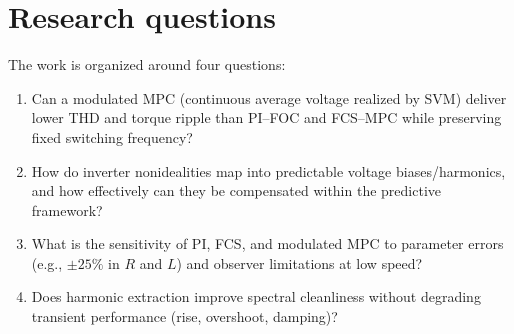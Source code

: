 \section{Research questions}
The work is organized around four questions:
\begin{enumerate}
  \item Can a modulated MPC (continuous average voltage realized by SVM) deliver lower THD and torque ripple than PI–FOC and FCS–MPC while preserving fixed switching frequency?
  \item How do inverter non\-idealities map into predictable voltage biases/harmonics, and how effectively can they be compensated within the predictive framework?
  \item What is the sensitivity of PI, FCS, and modulated MPC to parameter errors (e.g., $\pm25\%$ in $R$ and $L$) and observer limitations at low speed?
  \item Does harmonic extraction improve spectral cleanliness without degrading transient performance (rise, overshoot, damping)?
\end{enumerate}

